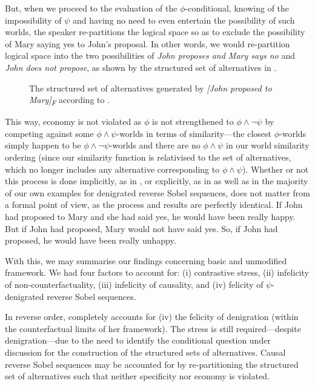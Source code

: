 But, when we proceed to the evaluation of the $\phi$-conditional, knowing of the impossibility of $\psi$ and having no need to even entertain the possibility of such worlds, the speaker re-partitions the logical space so as to exclude the possibility of Mary saying yes to John's proposal. In other words, we would re-partition logical space into the two possibilities of \textit{John proposes and Mary says no} and \textit{John does not propose}, as shown by the structured set of alternatives in .
\begin{figure}[!htb]
    \centering\hspace{-4cm}
    
    \caption{The structured set of alternatives generated by \textit{[John proposed to Mary]\textsubscript{F}} according to \textcite{Ippolito2020}.}
\end{figure}

This way, economy is not violated as $\phi$ is not strengthened to $\phi\land\neg\psi$ by competing against some $\phi\land\psi$-worlds in terms of similarity---the closest $\phi$-worlds simply happen to be $\phi\land\neg\psi$-worlds and there are no $\phi\land\psi$ in our world similarity ordering (since our similarity function is relativised to the set of alternatives, which no longer includes any alternative corresponding to $\phi\land\psi$). Whether or not this process is done implicitly, as in , or explicitly, as in  as well as in the majority of our own examples for denigrated reverse Sobel sequences, does not matter from a formal point of view, as the process and results are perfectly identical.
\pex\label{ex:moss-explicit}
\a If John had proposed to Mary and she had said yes, he would have been really happy.
\a But if John had proposed, Mary would not have said yes.
\a So, if John had proposed, he would have been really unhappy.\\\emptyfill\parencite[p. 663]{Ippolito2020}
\xe

With this, we may summarise our findings concerning  basic and unmodified framework. We had four factors to account for: (i) contrastive stress, (ii) infelicity of non-counterfactuality, (iii) infelicity of causality, and (iv) felicity of $\psi$-denigrated reverse Sobel sequences. 

In reverse order, \textcite{Ippolito2020} completely accounts for (iv) the felicity of denigration (within the counterfactual limits of her framework). The stress is still required---despite denigration---due to the need to identify the conditional question under discussion for the construction of the structured sets of alternatives. Causal reverse Sobel sequences may be accounted for by re-partitioning the structured set of alternatives such that neither specificity nor economy is violated.


